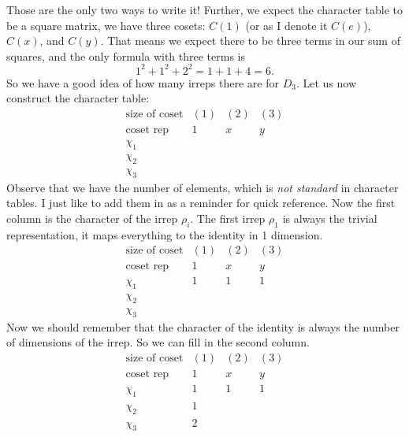 Those are the only two ways to write it! Further, we expect
the character table to be a square matrix, we have three
cosets: $C(1)$ (or as I denote it $C(e)$), $C(x)$, and
$C(y)$. That means we expect there to be three terms in our
sum of squares, and the only formula with three terms is
\begin{equation}
1^2+1^2+2^2=1+1+4=6.
\end{equation} 
So we have a good idea of how many irreps there are for
$D_3$. Let us now construct the character table:
\begin{equation}
\begin{array}{c|cccc}
\text{size of coset} & (1) & (2) & (3) \\
\text{coset rep} & 1 & x & y\\ \hline
\chi_1           &   &   &  \\ 
\chi_2           &   &   &  \\
\chi_3           &   &   & 
\end{array}
\end{equation}
Observe that we have the number of elements, which is
\emph{not standard} in character tables. I just like to add
them in as a reminder for quick reference. Now the first
column is the character of the irrep $\rho_i$. The first
irrep $\rho_1$ is always the trivial representation, it maps
everything to the identity in 1 dimension.
\begin{equation}
\begin{array}{c|cccc}
\text{size of coset} & (1) & (2) & (3) \\
\text{coset rep} & 1 & x & y\\ \hline
\chi_1           & 1 & 1 & 1\\ 
\chi_2           &   &   &  \\
\chi_3           &   &   & 
\end{array}
\end{equation}
Now we should remember that the character of the identity is
always the number of dimensions of the irrep. So we can fill
in the second column.
\begin{equation}
\begin{array}{c|cccc}
\text{size of coset} & (1) & (2) & (3) \\
\text{coset rep} & 1 & x & y\\ \hline
\chi_1           & 1 & 1 & 1\\ 
\chi_2           & 1 &   &  \\
\chi_3           & 2 &   & 
\end{array}
\end{equation}
